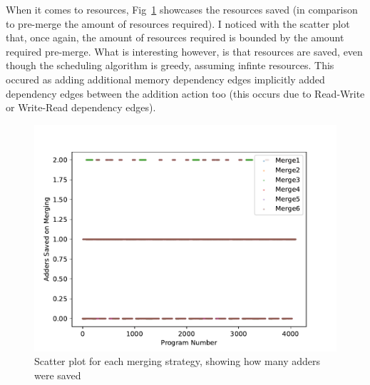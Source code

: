     When it comes to resources, Fig~\ref{Fig3} showcases the resources saved (in comparison to pre-merge the amount of resources required).
    I noticed with the scatter plot that, once again, the amount of resources required is bounded by the amount required pre-merge. 
    What is interesting however, is that resources are saved, even though the scheduling algorithm is greedy, assuming infinte resources.
    This occured as adding additional memory dependency edges implicitly added dependency edges between the addition action too (this occurs due to Read-Write or Write-Read dependency edges). 
    \begin{figure}
        \centering
        \includegraphics[scale=0.5]{m02.pdf}
        \caption{Scatter plot for each merging strategy, showing how many adders were saved}
        \label{Fig3}
    \end{figure}
    
